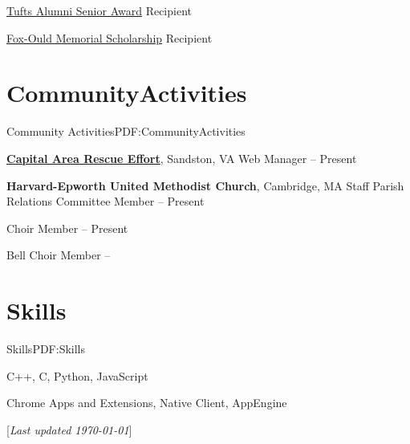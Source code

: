 \documentclass[letterpaper,MMMyyyy,nonstop]{simpleresumecv}
\newcommand{\CVNote}{Last updated {\today}}
\begin{document}
\begin{body}
\BulletItem
\href{http://tuftsalumni.org/who-we-are/alumni-recognition/senior-awards/}{Tufts Alumni Senior Award} Recipient
\hfill
{}

\BulletItem
\href{http://www.rrpcusa.org/pages.asp?pageid=110003}{Fox-Ould Memorial Scholarship} Recipient
\hfill
{}


\section{Community\newline Activities}{Community Activities}{PDF:CommunityActivities}

\href{http://www.carerva.com}{\textbf{Capital Area Rescue Effort}}, Sandston, VA
\GapNoBreak
\BulletItem
Web Manager
\hfill
{} -- Present

\BigGap

\textbf{Harvard-Epworth United Methodist Church}, Cambridge, MA
\GapNoBreak
\BulletItem
Staff Parish Relations Committee Member
\hfill
{} -- Present

\BulletItem
Choir Member
\hfill
{} -- Present

\BulletItem
Bell Choir Member
\hfill
{} -- 


\section{Skills}{Skills}{PDF:Skills}

C++,
C,
Python,
JavaScript

\Gap

Chrome Apps and Extensions,
Native Client,
AppEngine


\end{body}

\UseNoteFont%
\null\hfill%
[\textit{\CVNote}]%
\hspace{2.0mm}\null
\end{document}
